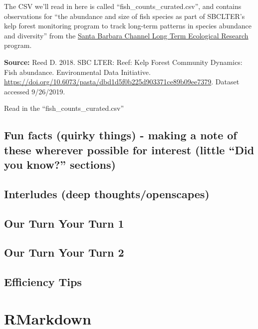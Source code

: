 \documentclass[]{book}
\begin{document}
The CSV we'll read in here is called ``fish\_counts\_curated.csv'', and contains observations for ``the abundance and size of fish species as part of SBCLTER's kelp forest monitoring program to track long-term patterns in species abundance and diversity'' from the \href{http://sbc.lternet.edu/}{Santa Barbara Channel Long Term Ecological Research} program.

\textbf{Source:} Reed D. 2018. SBC LTER: Reef: Kelp Forest Community Dynamics: Fish abundance. Environmental Data Initiative. \url{https://doi.org/10.6073/pasta/dbd1d5f0b225d903371ce89b09ee7379}. Dataset accessed 9/26/2019.

Read in the ``fish\_counts\_curated.csv''

\hypertarget{fun-facts-quirky-things---making-a-note-of-these-wherever-possible-for-interest-little-did-you-know-sections}{%
\section{Fun facts (quirky things) - making a note of these wherever possible for interest (little ``Did you know?'' sections)}\label{fun-facts-quirky-things---making-a-note-of-these-wherever-possible-for-interest-little-did-you-know-sections}}

\hypertarget{interludes-deep-thoughtsopenscapes-1}{%
\section{Interludes (deep thoughts/openscapes)}\label{interludes-deep-thoughtsopenscapes-1}}

\hypertarget{our-turn-your-turn-1-1}{%
\section{Our Turn Your Turn 1}\label{our-turn-your-turn-1-1}}

\hypertarget{our-turn-your-turn-2-1}{%
\section{Our Turn Your Turn 2}\label{our-turn-your-turn-2-1}}

\hypertarget{efficiency-tips-1}{%
\section{Efficiency Tips}\label{efficiency-tips-1}}

\hypertarget{rmarkdown}{%
\chapter{RMarkdown}\label{rmarkdown}}
\end{document}
